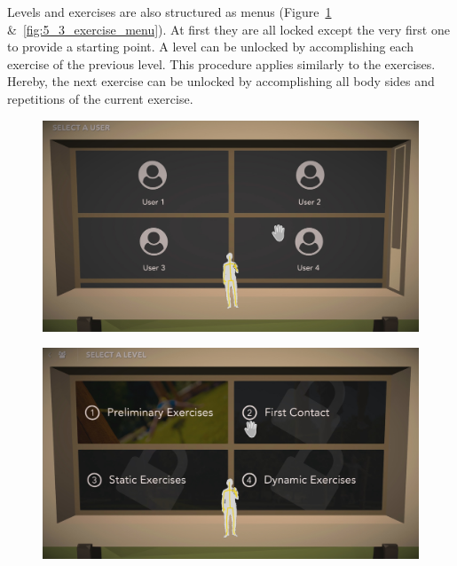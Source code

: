 Levels and exercises are also structured as menus (Figure~\ref{fig:5_3_level_menu} \&~\ref{fig:5_3_exercise_menu}).
At first they are all locked except the very first one to provide a starting point.
A level can be unlocked by accomplishing each exercise of the previous level.
This procedure applies similarly to the exercises.
Hereby, the next exercise can be unlocked by accomplishing all body sides and repetitions of the current exercise.
\begin{figure}[htb]
	\centering
	\begin{minipage}[t]{0.32\linewidth}
		\centering
		\includegraphics[width=1\linewidth]{Pictures/5_Workflow/5_UserMenu}
		\label{fig:5_3_user_menu}
	\end{minipage}
	\hfill
	\begin{minipage}[t]{0.32\linewidth}
		\centering
		\includegraphics[width=1\linewidth]{Pictures/5_Workflow/6_LevelMenu}
		\label{fig:5_3_level_menu}

\end{minipage}
\end{figure}

